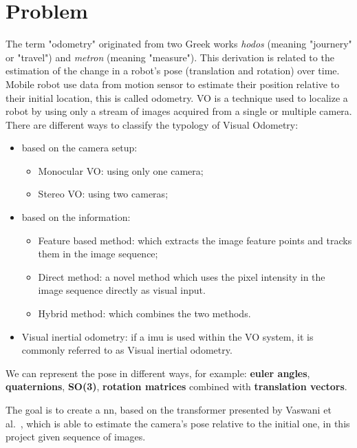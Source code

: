 \section{Problem}\label{sec:problem}
The term "odometry" originated from two Greek works \emph{hodos} (meaning "journery" or "travel") and \emph{metron} (meaning "measure").
This derivation is related to the estimation of the change in a robot's pose (translation and rotation) over time.
Mobile robot use data from motion sensor to estimate their position relative to their initial location, this is called odometry.
VO is a technique used to localize a robot by using only a stream of images acquired from a single or multiple camera.
There are different ways to classify the typology of Visual Odometry:
\begin{itemize}
    \item based on the camera setup:
        \begin{itemize}
            \item Monocular VO: using only one camera;
            \item Stereo VO: using two cameras;
        \end{itemize}
    \item based on the information:
        \begin{itemize}
            \item Feature based method: which extracts the image feature points and tracks them in the image sequence;
            \item Direct method: a novel method which uses the pixel intensity in the image sequence directly as visual input.
            \item Hybrid method: which combines the two methods.
        \end{itemize}
    \item Visual inertial odometry: if a \gls{imu} is used within the VO system, it is commonly referred to as Visual inertial odometry.
\end{itemize}
We can represent the pose in different ways, for example: \textbf{euler angles}, \textbf{quaternions}, \textbf{SO(3)}, \textbf{rotation matrices} combined with \textbf{translation vectors}.

The goal is to create a \gls{nn}, based on the transformer presented by Vaswani et al.~\cite{transformer_paper}, which is able to estimate the camera's pose relative to the initial one, in this project given sequence of images.